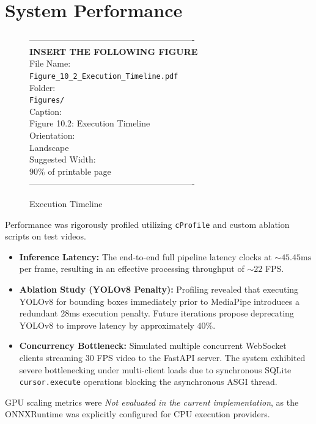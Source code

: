 \documentclass[12pt, a4paper]{report}
\begin{document}
\section{System Performance}
\begin{figure}[htbp]
\begin{center}
----------------------------------------------------------\\
\vspace{0.5em}
\textbf{INSERT THE FOLLOWING FIGURE}\\
\vspace{1em}
File Name:\\
\texttt{Figure\_10\_2\_Execution\_Timeline.pdf}\\
\vspace{1em}
Folder:\\
\texttt{Figures/}\\
\vspace{1em}
Caption:\\
Figure 10.2: Execution Timeline\\
\vspace{1em}
Orientation:\\
Landscape\\
\vspace{1em}
Suggested Width:\\
90\% of printable page\\
\vspace{3cm}
----------------------------------------------------------
\end{center}
\caption{Execution Timeline}
\label{fig:diag_16}
\end{figure}
Performance was rigorously profiled utilizing \texttt{cProfile} and custom ablation scripts on test videos.
\begin{itemize}
    \item \textbf{Inference Latency:} The end-to-end full pipeline latency clocks at $\sim45.45\text{ms}$ per frame, resulting in an effective processing throughput of $\sim22$ FPS.
    \item \textbf{Ablation Study (YOLOv8 Penalty):} Profiling revealed that executing YOLOv8 for bounding boxes immediately prior to MediaPipe introduces a redundant 28ms execution penalty. Future iterations propose deprecating YOLOv8 to improve latency by approximately $40\%$.
    \item \textbf{Concurrency Bottleneck:} Simulated multiple concurrent WebSocket clients streaming 30 FPS video to the FastAPI server. The system exhibited severe bottlenecking under multi-client loads due to synchronous SQLite \texttt{cursor.execute} operations blocking the asynchronous ASGI thread.
\end{itemize}
GPU scaling metrics were \textit{Not evaluated in the current implementation}, as the ONNXRuntime was explicitly configured for CPU execution providers.
\end{document}
